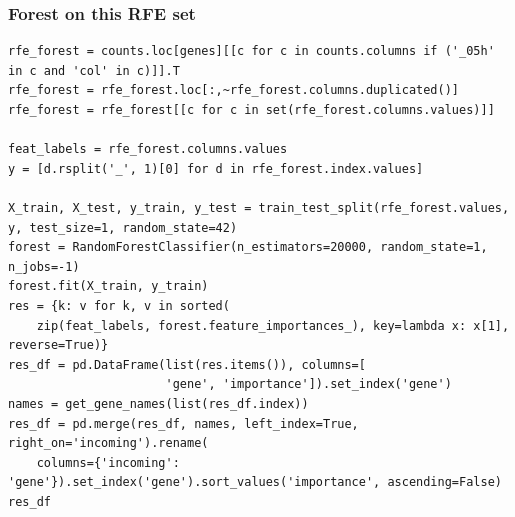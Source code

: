 \documentclass[11pt]{article}
\begin{document}
\subsubsection{Forest on this RFE set}
\label{sec:org0c5f01c}

\begin{verbatim}
rfe_forest = counts.loc[genes][[c for c in counts.columns if ('_05h' in c and 'col' in c)]].T
rfe_forest = rfe_forest.loc[:,~rfe_forest.columns.duplicated()]
rfe_forest = rfe_forest[[c for c in set(rfe_forest.columns.values)]]

feat_labels = rfe_forest.columns.values
y = [d.rsplit('_', 1)[0] for d in rfe_forest.index.values]

X_train, X_test, y_train, y_test = train_test_split(rfe_forest.values, y, test_size=1, random_state=42)
forest = RandomForestClassifier(n_estimators=20000, random_state=1, n_jobs=-1)
forest.fit(X_train, y_train)
res = {k: v for k, v in sorted(
    zip(feat_labels, forest.feature_importances_), key=lambda x: x[1], reverse=True)}
res_df = pd.DataFrame(list(res.items()), columns=[
                      'gene', 'importance']).set_index('gene')
names = get_gene_names(list(res_df.index))
res_df = pd.merge(res_df, names, left_index=True, right_on='incoming').rename(
    columns={'incoming': 'gene'}).set_index('gene').sort_values('importance', ascending=False)
res_df
\end{verbatim}
\end{document}
